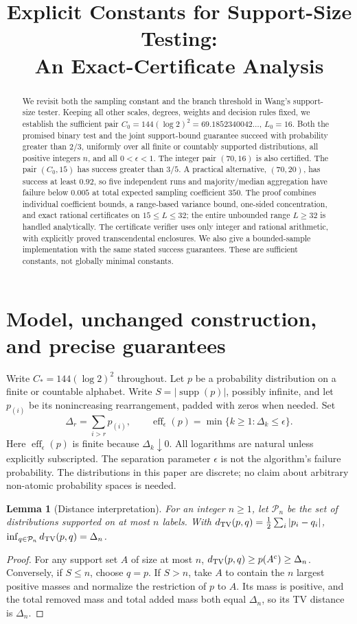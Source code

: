 \documentclass[10pt]{article}
\title{Explicit Constants for Support-Size Testing:\\An Exact-Certificate Analysis}
\author{}
\date{}
\newtheorem{lemma}{Lemma}
\newcommand{\eff}{\operatorname{eff}}
\begin{document}
\maketitle
\begin{abstract}
We revisit both the sampling constant and the branch threshold in Wang's
support-size tester. Keeping all other scales, degrees, weights and decision
rules fixed, we establish the sufficient pair
$C_0=144(\log 2)^2=69.1852340042\ldots$, $L_0=16$.
Both the promised binary test and the joint support-bound guarantee succeed
with probability greater than $2/3$, uniformly over all finite or countably
supported distributions, all positive integers $n$, and all $0<\epsilon<1$.
The integer pair $(70,16)$ is also certified. The pair $(C_0,15)$ has success
greater than $3/5$. A practical alternative, $(70,20)$, has success at least
$0.92$, so five independent runs and majority/median aggregation have failure
below $0.005$ at total expected sampling coefficient $350$.
The proof combines individual coefficient bounds, a range-based variance
bound, one-sided concentration, and exact rational certificates on
$15\le L\le32$; the entire unbounded range $L\ge32$ is handled analytically.
The certificate verifier uses only integer and rational arithmetic, with
explicitly proved transcendental enclosures. We also give a bounded-sample
implementation with the same stated success guarantees. These are sufficient
constants, not globally minimal constants.
\end{abstract}

\section{Model, unchanged construction, and precise guarantees}
Write $C_*=144(\log2)^2$ throughout.
Let $p$ be a probability distribution on a finite or countable alphabet.
Write $S=|\operatorname{supp}(p)|$, possibly infinite, and let $p_{(i)}$ be
its nonincreasing rearrangement, padded with zeros when needed. Set
\[
 \Delta_r=\sum_{i>r}p_{(i)},\qquad
 \eff_\epsilon(p)=\min\{k\ge1:\Delta_k\le\epsilon\}.
\]
Here $\eff_\epsilon(p)$ is finite because $\Delta_k\downarrow0$.
All logarithms are natural unless explicitly subscripted. The separation
parameter $\epsilon$ is not the algorithm's failure probability.
The distributions in this paper are discrete; no claim about arbitrary
non-atomic probability spaces is needed.

\begin{lemma}[Distance interpretation]\label{lem:tv}
For an integer $n\ge1$, let $\mathcal P_n$ be the set of distributions supported on at most $n$
labels. With $d_{\rm TV}(p,q)=\tfrac12\sum_i|p_i-q_i|$,
$\inf_{q\in\mathcal P_n}d_{\rm TV}(p,q)=\Delta_n$.
\end{lemma}
\begin{proof}
For any support set $A$ of size at most $n$,
$d_{\rm TV}(p,q)\ge p(A^c)\ge\Delta_n$.
Conversely, if $S\le n$, choose $q=p$. If $S>n$, take $A$ to contain the
$n$ largest positive masses and normalize the
restriction of $p$ to $A$. Its mass is positive, and the total removed mass
and total added mass both equal $\Delta_n$, so its TV distance is $\Delta_n$.
\end{proof}
\end{document}
